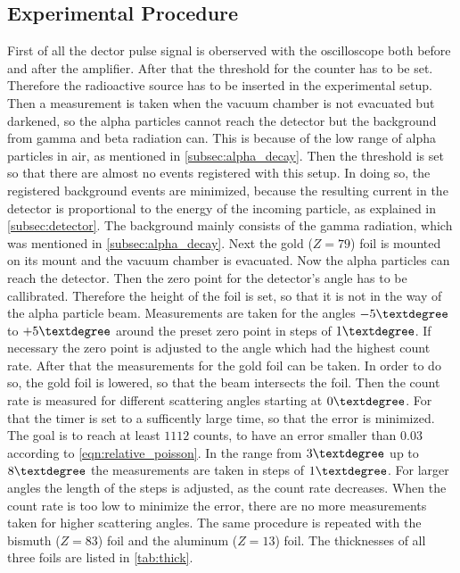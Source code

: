 \subsection{Experimental Procedure}
First of all the dector pulse signal is oberserved with the oscilloscope both before and after the amplifier. 
\newline
After that the threshold for the counter has to be set. 
Therefore the radioactive source has to be inserted in the experimental setup.
Then a measurement is taken when the vacuum chamber is not evacuated but darkened, so the alpha particles cannot reach the detector but the background from gamma and beta radiation can. 
This is because of the low range of alpha particles in air, as mentioned in \autoref{subsec:alpha_decay}.
Then the threshold is set so that there are almost no events registered with this setup.
In doing so, the registered background events are minimized,
because the resulting current in the detector is proportional to the energy of the incoming particle, as explained in \autoref{subsec:detector}.
The background mainly consists of the gamma radiation, which was mentioned in \autoref{subsec:alpha_decay}.
\newline
Next the gold ($Z=79$) foil is mounted on its mount and the vacuum chamber is evacuated. 
Now the alpha particles can reach the detector. 
Then the zero point for the detector's angle has to be callibrated. 
Therefore the height of the foil is set, so that it is not in the way of the alpha particle beam. 
Measurements are taken for the angles $-5 \textdegree$ to $+5 \textdegree$ around the preset zero point in steps of $1 \textdegree$.
If necessary the zero point is adjusted to the angle which had the highest count rate.
\newline
After that the measurements for the gold foil can be taken. 
In order to do so, the gold foil is lowered, so that the beam intersects the foil. 
Then the count rate is measured for different scattering angles starting at $0\textdegree$.
For that the timer is set to a sufficently large time, so that the error is minimized. 
The goal is to reach at least $1112$ counts, to have an error smaller than $0.03$ according to \autoref{eqn:relative_poisson}.
In the range from $3\textdegree$ up to $8\textdegree$ the measurements are taken in steps of $1 \textdegree$. 
For larger angles the length of the steps is adjusted, as the count rate decreases. 
When the count rate is too low to minimize the error, there are no more measurements taken for higher scattering angles. 
\newline
The same procedure is repeated with the bismuth ($Z=83$) foil and the aluminum ($Z=13$) foil.
The thicknesses of all three foils are listed in \autoref{tab:thick}.



